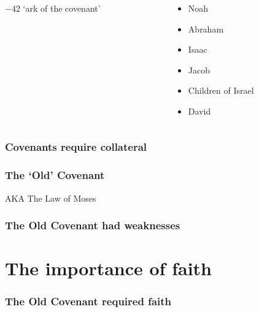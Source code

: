 \begin{frame}
\begin{columns}[T]
\begin{column}{0.4\textwidth}
\begin{center}
		\end{center}
	{\footnotesize $-42$ `ark of the covenant'}
\end{column}
\begin{column}{0.6\textwidth}
	\begin{itemize}
	\item{Noah}
	\item{Abraham}
	\item{Isaac}
	\item{Jacob}
	\item{Children of Israel}
	\item{David}
	\end{itemize}
\end{column}
\end{columns}

\end{frame}

\begin{frame}
\frametitle{Covenants require collateral}
\end{frame}

\begin{frame}

\end{frame}
\begin{frame}
\frametitle{The `Old' Covenant}

\note[item] AKA The Law of Moses
\end{frame}

\begin{frame}
\frametitle{The Old Covenant had weaknesses}

\end{frame}

\section{The importance of faith}

\begin{frame}
\frametitle{The Old Covenant required faith}

\end{frame}

